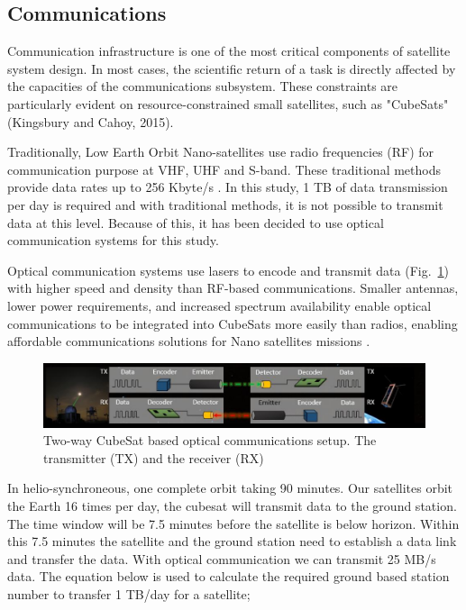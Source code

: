 \documentclass{scrartcl}
\begin{document}
\subsection{Communications}
\label{sec:orgf581e5f}

Communication infrastructure is one of the most critical components of
satellite system design. In most cases, the scientific return of a task
is directly affected by the capacities of the communications subsystem.
These constraints are particularly evident on resource-constrained small
satellites, such as "CubeSats" (Kingsbury and Cahoy, 2015).

Traditionally, Low Earth Orbit Nano-satellites use radio frequencies
(RF) for communication purpose at VHF, UHF and S-band. These traditional
methods provide data rates up to 256 Kbyte/s \citep{ochoa}. In this
study, 1 TB of data transmission per day is required and with
traditional methods, it is not possible to transmit data at this level.
Because of this, it has been decided to use optical communication
systems for this study.

Optical communication systems use lasers to encode and transmit data (Fig.~\ref{fig:eng_fig})
with higher speed and density than RF-based communications. Smaller
antennas, lower power requirements, and increased spectrum availability
enable optical communications to be integrated into CubeSats more easily
than radios, enabling affordable communications solutions for Nano
satellites missions \citep{nasa_cube}.

\begin{figure}[hbpt]
\centering
\includegraphics[width=0.8\linewidth]{img/eng_fig_3.png}
 \caption{Two-way CubeSat based optical communications setup. The
 transmitter (TX) and the receiver (RX) \citep{nasa_cube}}
 \label{fig:eng_fig}
\end{figure}

In helio-synchroneous, one complete orbit taking 90 minutes. Our
satellites orbit the Earth 16 times per day, the cubesat will transmit
data to the ground station. The time window will be 7.5 minutes before
the satellite is below horizon. Within this 7.5 minutes the satellite
and the ground station need to establish a data link and transfer the
data. With optical communication we can transmit 25 MB/s data. The
equation below is used to calculate the required ground based station
number to transfer 1 TB/day for a satellite;
\end{document}
